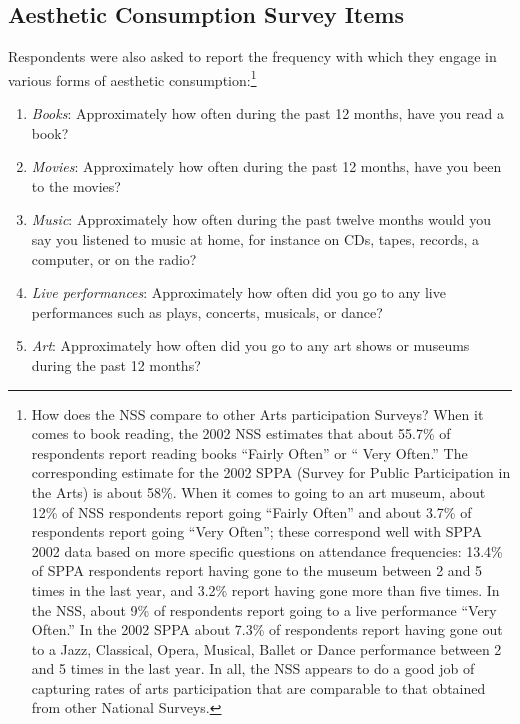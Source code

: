 \documentclass[11pt]{article}
\begin{document}
\subsection{Aesthetic Consumption Survey Items}
Respondents were also asked to report the frequency with which they engage in various forms of aesthetic consumption:\footnote{How does the NSS compare to other Arts participation Surveys?  When it comes to book reading, the 2002 NSS estimates that about 55.7\% of respondents report reading books ``Fairly Often'' or `` Very Often.''  The corresponding estimate for the 2002 SPPA (Survey for Public Participation in the Arts) is about 58\%.  When it comes to going to an art museum, about 12\% of NSS respondents report going ``Fairly Often'' and about 3.7\% of respondents report going ``Very Often''; these correspond well with SPPA 2002 data based on more specific questions on attendance frequencies:  13.4\% of SPPA respondents report having gone to the museum between 2 and 5 times in the last year, and 3.2\% report having gone more than five times.  In the NSS, about 9\% of respondents report going to a live performance ``Very Often.''  In the 2002 SPPA about 7.3\% of respondents report having gone out to a Jazz, Classical, Opera, Musical, Ballet or Dance performance between 2 and 5 times in the last year.  In all, the NSS appears to do a good job of capturing rates of arts participation that are comparable to that obtained from other National Surveys.}
 
\begin{enumerate}
\item  \emph{Books}:  Approximately how often during the past 12 months, have you read a book?
\item  \emph{Movies}:  Approximately how often during the past 12 months, have you been to the movies? 
\item\emph{Music}: Approximately how often during the past twelve months would you say you listened to music at home, for instance on CDs, tapes, records, a computer, or on the radio?
\item  \emph{Live performances}: Approximately how often did you go to any live performances such as plays, concerts, musicals, or dance?
\item  \emph{Art}:  Approximately how often did you go to any art shows or museums during the past 12 months? 
\end{enumerate}  
\end{document}
